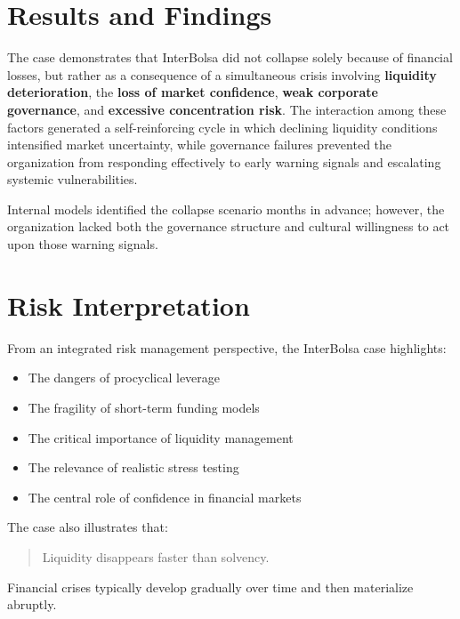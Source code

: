 \vspace{0.5cm}

\section{Results and Findings}

The case demonstrates that InterBolsa did not collapse solely because of financial losses, but rather as a consequence of a simultaneous crisis involving \textbf{liquidity deterioration}, the \textbf{loss of market confidence}, \textbf{weak corporate governance}, and \textbf{excessive concentration risk}. The interaction among these factors generated a self-reinforcing cycle in which declining liquidity conditions intensified market uncertainty, while governance failures prevented the organization from responding effectively to early warning signals and escalating systemic vulnerabilities.

Internal models identified the collapse scenario months in advance; however, the organization lacked both the governance structure and cultural willingness to act upon those warning signals.

\vspace{0.5cm}

\section{Risk Interpretation}

From an integrated risk management perspective, the InterBolsa case highlights:

\begin{itemize}
    \item The dangers of procyclical leverage
    \item The fragility of short-term funding models
    \item The critical importance of liquidity management
    \item The relevance of realistic stress testing
    \item The central role of confidence in financial markets
\end{itemize}

The case also illustrates that:

\begin{quote}
Liquidity disappears faster than solvency.
\end{quote}

Financial crises typically develop gradually over time and then materialize abruptly.

